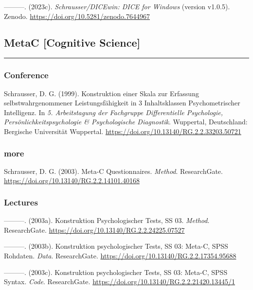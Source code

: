 \documentclass[
]{article}
\begin{document}
---------. (2023c). \emph{Schrausser/DICEwin: DICE for Windows} (version
v1.0.5). Zenodo. \url{https://doi.org/10.5281/zenodo.7644967}

\hypertarget{metac-cognitive-science}{%
\subsection{MetaC {[}Cognitive
Science{]}}\label{metac-cognitive-science}}

\begin{center}\rule{0.5\linewidth}{0.5pt}\end{center}

\hypertarget{conference}{%
\subsubsection{Conference}\label{conference}}

Schrausser, D. G. (1999). Konstruktion einer Skala zur Erfassung
selbstwahrgenommener Leistungsfähigkeit in 3 Inhaltsklassen
Psychometrischer Intelligenz. In \emph{5. Arbeitstagung der Fachgruppe
Differentielle Psychologie, Persönlichkeitspsychologie \& Psychologische
Diagnostik}. Wuppertal, Deutschland: Bergische Universität Wuppertal.
\url{https://doi.org/10.13140/RG.2.2.33203.50721}

\hypertarget{more}{%
\subsubsection{more}\label{more}}

Schrausser, D. G. (2003). Meta-C Questionnaires. \emph{Method}.
ResearchGate. \url{https://doi.org/10.13140/RG.2.2.14101.40168}

\hypertarget{lectures-1}{%
\subsubsection{Lectures}\label{lectures-1}}

---------. (2003a). Konstruktion Psychologischer Tests, SS 03.
\emph{Method}. ResearchGate.
\url{https://doi.org/10.13140/RG.2.2.24225.07527}

---------. (2003b). Konstruktion psychologischer Tests, SS 03: Meta-C,
SPSS Rohdaten. \emph{Data}. ResearchGate.
\url{https://doi.org/10.13140/RG.2.2.17354.95688}

---------. (2003c). Konstruktion psychologischer Tests, SS 03: Meta-C,
SPSS Syntax. \emph{Code}. ResearchGate.
\url{https://doi.org/10.13140/RG.2.2.21420.13445/1}
\end{document}
